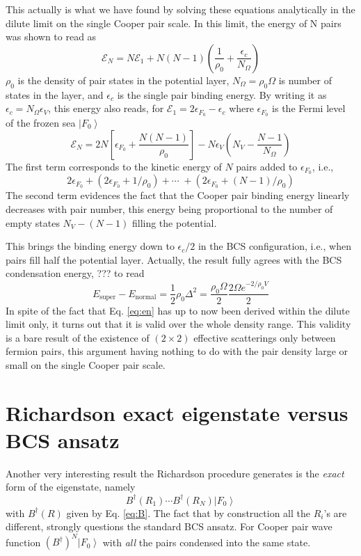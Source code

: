 \documentclass[aps,prb,amsmath,amssymb,superscriptaddress,twocolumn]{revtex4-1}
\newcommand{\E}{\ensuremath{\mathbf{E}}}
\newcommand{\ket}[1]{\ensuremath{\left|#1\right>}}
\newcommand{\nth}[1]{\ensuremath{\frac{1}{#1}}}
\newcommand{\br}[1]{\ensuremath{\left(#1\right)}}
\newcommand{\mbr}[1]{\ensuremath{\left[#1\right]}}
\newcommand{\efo}{\epsilon_{F_0}}
\newcommand{\fo}{\ensuremath{\ket{F_0}}}
\renewcommand{\E}{\ensuremath{\mathcal{E}}}
\begin{document}
This actually is what we have found by solving these equations analytically in the dilute limit on the single Cooper pair scale.   In this limit, the energy of N pairs was shown to read as 
\begin{equation}\label{eq:en}
\E_N=N\E_1+N(N-1)\br{\nth{\rho_0}+\frac{\epsilon_c}{N_\Omega}}
\end{equation}
$\rho_0$ is the density of pair states in the potential layer, $N_\Omega=\rho_0\Omega$ is number of states in the layer, and $\epsilon_c$ is the single pair binding energy.  By writing it as $\epsilon_c=N_\Omega\epsilon_V$, this energy also reads, for $\E_1=2\epsilon_{F_0}-\epsilon_c$ where $\epsilon_{F_0}$ is the Fermi level of the frozen sea \fo
\begin{equation}
\E_N=2N\mbr{\epsilon_{F_0}+\frac{N(N-1)}{\rho_0}}-N\epsilon_V\br{N_V-\frac{N-1}{N_\Omega}}
\end{equation}
The first term corresponds to the kinetic energy of $N$ pairs added to $\epsilon_{F_0}$, i.e., 
\begin{equation}
2\efo+\br{2\efo+1/\rho_0}+\cdots\;+\br{2\efo+(N-1)/\rho_0}
\end{equation}
The second term evidences the fact that the Cooper pair binding energy linearly decreases with pair number, this energy being proportional to the number of empty states $N_V-(N-1)$ filling the potential.  

This brings the binding energy down to $\epsilon_c/2$ in the BCS configuration, i.e., when pairs fill half the potential layer. Actually, the result  fully agrees with the BCS condensation energy, ??? to read
\begin{equation}
E_{\text{super}}-E_\text{normal}=\nth{2}\rho_0\Delta^2=\frac{\rho_0\Omega}{2}\frac{2\Omega{e^{-2/\rho_0V}}}{2}
\end{equation}
In spite of the fact that Eq. \eqref{eq:en} has up to now been derived within the dilute limit only, it turns out that it is valid over the whole density range.  This validity is a bare result of the existence of $(2\times2)$ effective scatterings only between fermion pairs, this argument having nothing to do with the pair density large or small on the single Cooper pair scale. 

\section{Richardson exact eigenstate versus BCS ansatz \label{sec:conn}}
Another very interesting result the Richardson procedure generates is the \emph{exact} form of the eigenstate, namely
\begin{equation}
B^{\dagger}(R_1)\cdots{}B^{\dagger}(R_N)\fo
\end{equation}
with $B^{\dagger}(R)$ given by Eq. \eqref{eq:B}.  The fact that by construction all the $R_i$'s are different, strongly questions the standard BCS ansatz. For Cooper pair wave function $\br{B^{\dagger}}^N\fo$ with \emph{all} the pairs condensed into the same state. 
\end{document}
